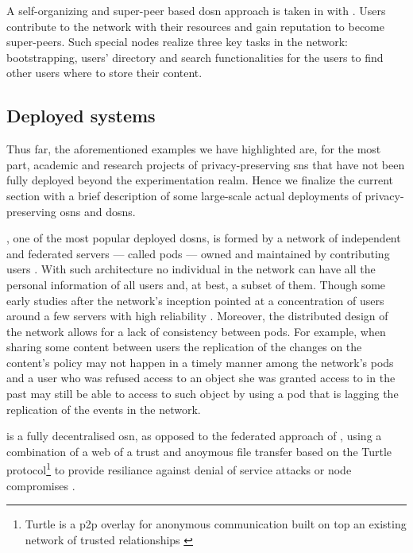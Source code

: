 A self-organizing and super-peer based \ac{dosn} approach is taken in \cite{SharmaD12} 
with \SuperNova. Users contribute to the network with their resources and gain reputation 
to become super-peers. Such special nodes realize three key tasks in the network: 
bootstrapping, users' directory and search functionalities for the users to find 
other users where to store their content.

\subsection{Deployed systems}
    \label{subsection:thesis:deployed-systems}
Thus far, the aforementioned examples we have highlighted are, for the most part, 
academic and research projects of privacy-preserving \acp{sn} that have not been 
fully deployed beyond the experimentation realm. Hence we finalize the current section 
with a brief description of some large-scale actual deployments of privacy-preserving 
\acp{osn} and \acp{dosn}.

\diaspora, one of the most popular deployed \acp{dosn}, is formed by a network of 
independent and federated servers --- called pods --- owned and maintained by contributing 
users \cite{Diaspora}. With such architecture no individual in the network can have 
all the personal information of all users and, at best, a subset of them. Though 
some early studies after the network's inception pointed at a concentration of users 
around a few servers with high reliability \cite{BielenbergHGSZ12}. Moreover, the 
distributed design of the network allows for a lack of consistency between pods. 
For example, when sharing some content between users the replication of the changes 
on the content's policy may not happen in a timely manner among the network's pods 
and a user who was refused access to an object she was granted access to in the 
past may still be able to access to such object by using a pod that is lagging the 
replication of the events in the network.

\Retroshare is a fully decentralised \ac{osn}, as opposed to the federated approach 
of \diaspora, using a combination of a web of a trust and anoymous file transfer 
based on the Turtle protocol\footnote{Turtle is a \ac{p2p} overlay for anonymous 
communication built on top an existing network of trusted relationships \cite{PopescuCT04}} 
to provide resiliance against denial of service attacks or node compromises \cite{Retroshare}. 

